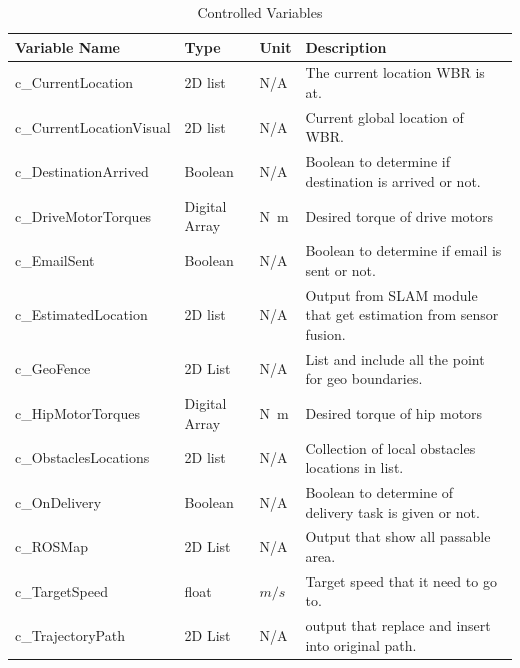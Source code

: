 \documentclass[12pt]{article}
\begin{document}
    
        \begin{table}[H]
            \caption{Controlled Variables}
            \begin{tabularx}{\textwidth}{|p{4cm}|p{2.5cm}|p{1cm}|X|}
                \toprule
                \textbf{Variable Name} & \textbf{Type} & \textbf{Unit} & \textbf{Description}           \\
                \midrule
                c\_CurrentLocation & 2D list &  N/A  & The current location WBR is at.\\
                c\_CurrentLocationVisual & 2D list &  N/A & Current global location of WBR.\\
                c\_DestinationArrived & Boolean &  N/A & Boolean to determine if destination is arrived or not.\\
                c\_DriveMotorTorques   & Digital Array & \unit{N.m}    & Desired torque of drive motors \\
                c\_EmailSent & Boolean &  N/A  & Boolean to determine if email is sent or not.\\
                c\_EstimatedLocation & 2D list &  N/A & Output from SLAM module that get estimation from sensor fusion.\\
                c\_GeoFence & 2D List & N/A & List and include all the point for geo boundaries.\\
                c\_HipMotorTorques  & Digital Array & \unit{N.m}    & Desired torque of hip motors   \\
                c\_ObstaclesLocations & 2D list &  N/A & Collection of local obstacles locations in list.\\
                c\_OnDelivery & Boolean &  N/A & Boolean to determine of delivery task is given or not.\\
                c\_ROSMap & 2D List & N/A  & Output that show all passable area.\\
                c\_TargetSpeed & float & $m/s$  & Target speed that it need to go to.\\
                c\_TrajectoryPath & 2D List & N/A & output that replace and insert into original path.\\
                \bottomrule
            \end{tabularx}
        \end{table}
    
\end{document}
